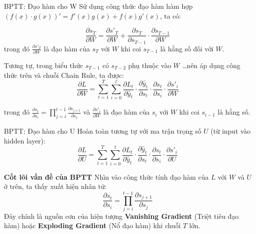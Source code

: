 \documentclass[aspectratio=169, 10pt]{beamer}
\begin{document}
\begin{frame}{BPTT: Đạo hàm cho W}
\small
Sử dụng công thức đạo hàm hàm hợp $(f(x) \cdot g(x))' = f'(x)g(x) + f(x)g'(x)$, ta có:

\[ \frac{\partial s_T}{\partial W} = \frac{\partial s'_T}{\partial W} + \frac{\partial s_T}{\partial s_{T-1}} \cdot \frac{\partial s_{T-1}}{\partial W} \]
trong đó $\frac{\partial s'_T}{\partial W}$ là đạo hàm của $s_T$ với $W$ khi coi $s_{T-1}$ là hằng số đối với $W$.

Tương tự, trong biểu thức $s_{T-1}$ có $s_{T-2}$ phụ thuộc vào $W$ \dots nên áp dụng công thức trên và chuỗi Chain Rule, ta được:
\[ \frac{\partial L}{\partial W} = \sum_{t=1}^{T} \sum_{i=0}^{t} \frac{\partial L_t}{\partial \hat{y}_t} \cdot \frac{\partial \hat{y}_t}{\partial s_t} \cdot \frac{\partial s_t}{\partial s_i} \cdot \frac{\partial s'_i}{\partial W} \]

trong đó $\frac{\partial s_t}{\partial s_i} = \prod_{j=i}^{t-1} \frac{\partial s_{j+1}}{\partial s_j}$ và $\frac{\partial s'_i}{\partial W}$ là đạo hàm của $s_i$ với $W$ khi coi $s_{i-1}$ là hằng số.
\end{frame}

\begin{frame}{BPTT: Đạo hàm cho U}
\small
Hoàn toàn tương tự với ma trận trọng số $U$ (từ input vào hidden layer):
\[ \frac{\partial L}{\partial U} = \sum_{t=1}^{T} \sum_{i=0}^{t} \frac{\partial L_t}{\partial \hat{y}_t} \cdot \frac{\partial \hat{y}_t}{\partial s_t} \cdot \frac{\partial s_t}{\partial s_i} \cdot \frac{\partial s'_i}{\partial U} \]

\vspace{0.4cm}
\begin{alertblock}{\textbf{Cốt lõi vấn đề của BPTT}}
Nhìn vào công thức tính đạo hàm của $L$ với $W$ và $U$ ở trên, ta thấy xuất hiện nhân tử:
\[ \frac{\partial s_t}{\partial s_i} = \prod_{j=i}^{t-1} \frac{\partial s_{j+1}}{\partial s_j} \]
Đây chính là nguồn cơn của hiện tượng \textbf{Vanishing Gradient} (Triệt tiêu đạo hàm) hoặc \textbf{Exploding Gradient} (Nổ đạo hàm) khi chuỗi $T$ lớn.
\end{alertblock}
\end{frame}
\end{document}
